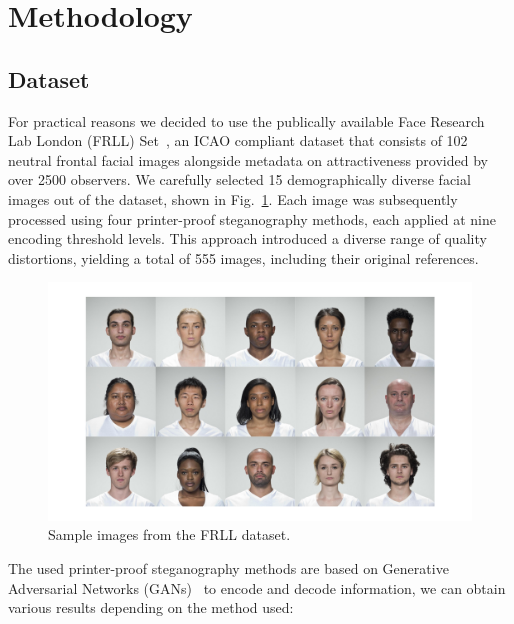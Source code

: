 \section{Methodology}\label{sec:methodology}

\subsection{Dataset}

For practical reasons we decided to use the publically available Face Research Lab London (FRLL) Set~\cite{DeBruine2017}, an ICAO compliant dataset that consists of 102 neutral frontal facial images alongside metadata on attractiveness provided by over 2500 observers. We carefully selected 15 demographically diverse facial
images out of the dataset, shown in Fig.~\ref{fig:subdataset}. Each image was subsequently processed using four printer-proof steganography methods, each applied at nine encoding threshold levels. This approach introduced a diverse range of quality distortions, yielding a total of 555 images, including their original references.

\begin{figure}[!htbp]
    \centering
    \includegraphics[width=1\linewidth]{images/subdataset.png}
    \caption{Sample images from the FRLL dataset.}\label{fig:subdataset}
\end{figure}

The used printer-proof steganography methods are based on Generative Adversarial Networks (GANs)~\cite{gans2018} to encode and decode information, we can obtain various results depending on the method used:


